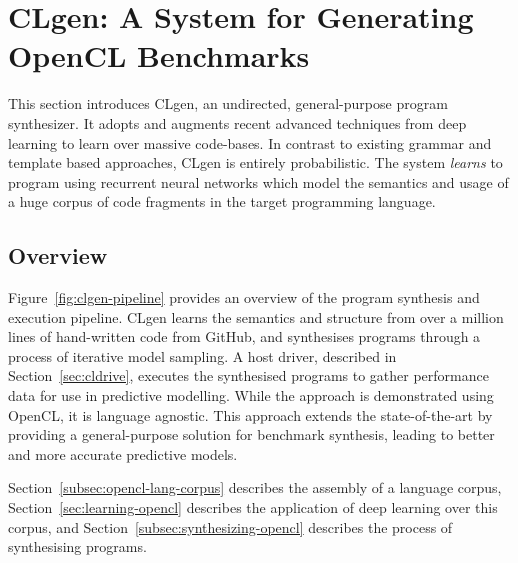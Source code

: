 \section{CLgen: A System for Generating OpenCL Benchmarks}%
\label{sec:clgen}

This section introduces CLgen, an undirected, general-purpose program synthesizer. It adopts and augments recent advanced techniques from deep learning to learn over massive code-bases. In contrast to existing grammar and template based approaches, CLgen is entirely probabilistic. The system \emph{learns} to program using recurrent neural networks which model the semantics and usage of a huge corpus of code fragments in the target programming language.

\subsection{Overview}

Figure~\ref{fig:clgen-pipeline} provides an overview of the program synthesis and execution pipeline. CLgen learns the semantics and structure from over a million lines of hand-written code from GitHub, and synthesises programs through a process of iterative model sampling. A host driver, described in Section~\ref{sec:cldrive}, executes the synthesised programs to gather performance data for use in predictive modelling. While the approach is demonstrated using OpenCL, it is language agnostic. This approach extends the state-of-the-art by providing a general-purpose solution for benchmark synthesis, leading to better and more accurate predictive models.

Section~\ref{subsec:opencl-lang-corpus} describes the assembly of a language corpus, Section~\ref{sec:learning-opencl} describes the application of deep learning over this corpus, and Section~\ref{subsec:synthesizing-opencl} describes the process of synthesising programs.

